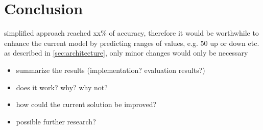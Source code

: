 \section{Conclusion}
\label{sec:ausblick}
simplified approach reached xx\% of accuracy, therefore it would be worthwhile to enhance the current model by predicting ranges of values, e.g. 50 up or down etc.
as described in \ref{sec:architecture}, only minor changes would only be necessary
\begin{itemize}
	\item summarize the results (implementation? evaluation results?) 
	\item does it work? why? why not? 
	\item how could the current solution be improved? 
	\item possible further research? 
\end{itemize}